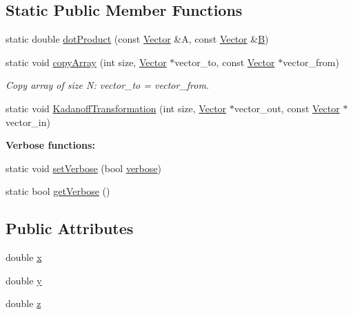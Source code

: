 \subsection*{Static Public Member Functions}
\begin{DoxyCompactItemize}
\item 
static double \hyperlink{class_p_c_a_1_1_vector_abc89550f2ef587f808a7fea91259a22a}{dot\+Product} (const \hyperlink{class_p_c_a_1_1_vector}{Vector} \&A, const \hyperlink{class_p_c_a_1_1_vector}{Vector} \&\hyperlink{scaling_picture__new_8m_a9d3d9048db16a7eee539e93e3618cbe7}{B})
\item 
static void \hyperlink{class_p_c_a_1_1_vector_a865b60bf89b1dbf3165b8cc503dce2ca}{copy\+Array} (int size, \hyperlink{class_p_c_a_1_1_vector}{Vector} $\ast$vector\+\_\+to, const \hyperlink{class_p_c_a_1_1_vector}{Vector} $\ast$vector\+\_\+from)
\begin{DoxyCompactList}\small\item\em Copy array of size N\+: vector\+\_\+to = vector\+\_\+from. \end{DoxyCompactList}\item 
static void \hyperlink{class_p_c_a_1_1_vector_a385f07b1056ab2a7648b0b9dd03cd8b0}{Kadanoff\+Transformation} (int size, \hyperlink{class_p_c_a_1_1_vector}{Vector} $\ast$vector\+\_\+out, const \hyperlink{class_p_c_a_1_1_vector}{Vector} $\ast$vector\+\_\+in)
\end{DoxyCompactItemize}
\begin{Indent}{\bf Verbose functions\+:}\par
\begin{DoxyCompactItemize}
\item 
static void \hyperlink{class_p_c_a_1_1_vector_a585f8511431df02801aa9cff0e2f1ae4}{set\+Verbose} (bool \hyperlink{class_p_c_a_1_1_vector_a6ef8075198903147f945d0ec81b8defd}{verbose})
\item 
static bool \hyperlink{class_p_c_a_1_1_vector_a06b3f5087a02159bee1f49401db7aad3}{get\+Verbose} ()
\end{DoxyCompactItemize}
\end{Indent}
\subsection*{Public Attributes}
\begin{DoxyCompactItemize}
\item 
double \hyperlink{class_p_c_a_1_1_vector_ac14a3d674fa7956b18a7e2b25aa9b4bb}{x}
\item 
double \hyperlink{class_p_c_a_1_1_vector_a75d5d6af0e3f847456d54412b86c53c0}{y}
\item 
double \hyperlink{class_p_c_a_1_1_vector_a715bde094c7e430c9c39769f6790b835}{z}
\end{DoxyCompactItemize}
